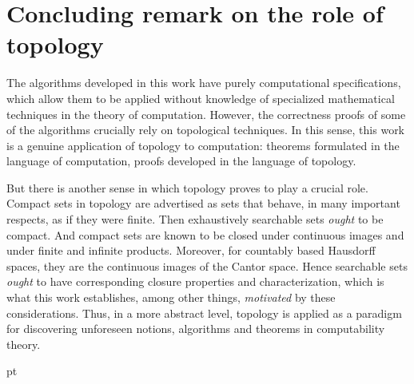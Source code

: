 \documentclass{LMCS}
\begin{document}
\section{Concluding remark on the role of topology} 
\label{conclusion}

The algorithms developed in this work have purely computational
specifications, which allow them to be applied without knowledge of
specialized mathematical techniques in the theory of computation.
However, the correctness proofs of some of the algorithms crucially
rely on topological techniques. In this sense, this work is a genuine
application of topology to computation: theorems formulated in the
language of computation, proofs developed in the language of topology.

But there is another sense in which topology proves to play a crucial
role.  Compact sets in topology are advertised as sets that behave, in
many important respects, as if they were finite.  Then exhaustively
searchable sets \emph{ought} to be compact.  And compact sets are
known to be closed under continuous images and under finite and
infinite products.  Moreover, for countably based Hausdorff spaces,
they are the continuous images of the Cantor space.  Hence searchable
sets \emph{ought} to have corresponding closure properties and
characterization, which is what this work establishes, among other
things, \emph{motivated} by these considerations.  Thus, in a more
abstract level, topology is applied as a paradigm for discovering
unforeseen notions, algorithms and theorems in computability theory.




\nocite{smyth:topology}



 pt
\end{document}
